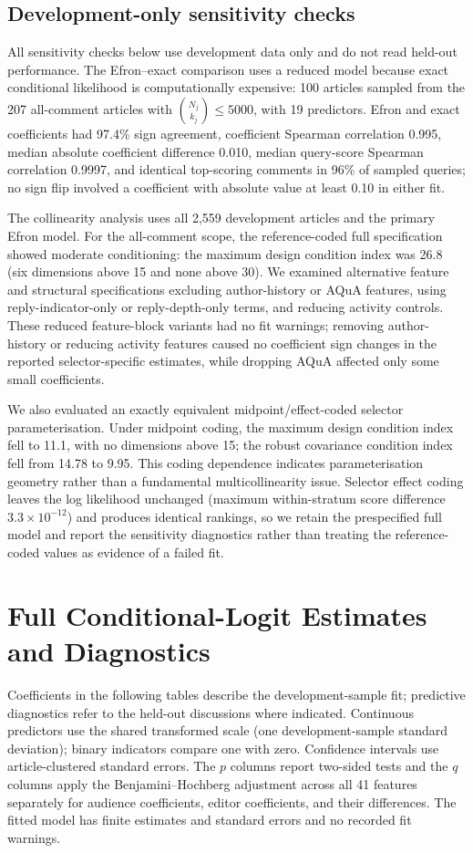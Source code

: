 \subsection{Development-only sensitivity checks}
\label{app:sensitivity}
All sensitivity checks below use development data only and do not read held-out performance. The Efron--exact comparison uses a reduced model because exact conditional likelihood is computationally expensive: 100 articles sampled from the 207 all-comment articles with $\binom{N_j}{k_j}\leq5000$, with 19 predictors. Efron and exact coefficients had 97.4\% sign agreement, coefficient Spearman correlation 0.995, median absolute coefficient difference 0.010, median query-score Spearman correlation 0.9997, and identical top-scoring comments in 96\% of sampled queries; no sign flip involved a coefficient with absolute value at least 0.10 in either fit.

The collinearity analysis uses all 2,559 development articles and the primary Efron model. For the all-comment scope, the reference-coded full specification showed moderate conditioning: the maximum design condition index was 26.8 (six dimensions above 15 and none above 30). We examined alternative feature and structural specifications excluding author-history or AQuA features, using reply-indicator-only or reply-depth-only terms, and reducing activity controls. These reduced feature-block variants had no fit warnings; removing author-history or reducing activity features caused no coefficient sign changes in the reported selector-specific estimates, while dropping AQuA affected only some small coefficients.

We also evaluated an exactly equivalent midpoint/effect-coded selector parameterisation. Under midpoint coding, the maximum design condition index fell to 11.1, with no dimensions above 15; the robust covariance condition index fell from 14.78 to 9.95. This coding dependence indicates parameterisation geometry rather than a fundamental multicollinearity issue. Selector effect coding leaves the log likelihood unchanged (maximum within-stratum score difference $3.3\times10^{-12}$) and produces identical rankings, so we retain the prespecified full model and report the sensitivity diagnostics rather than treating the reference-coded values as evidence of a failed fit.

\section{Full Conditional-Logit Estimates and Diagnostics}
\label{app:regression}
Coefficients in the following tables describe the development-sample fit; predictive diagnostics refer to the held-out discussions where indicated. Continuous predictors use the shared transformed scale (one development-sample standard deviation); binary indicators compare one with zero. Confidence intervals use article-clustered standard errors. The $p$ columns report two-sided tests and the $q$ columns apply the Benjamini--Hochberg adjustment across all 41 features separately for audience coefficients, editor coefficients, and their differences. The fitted model has finite estimates and standard errors and no recorded fit warnings.

